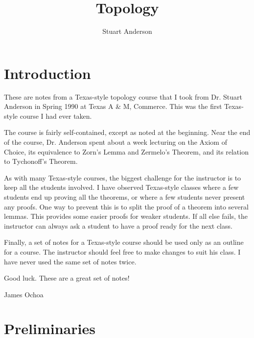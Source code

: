 \documentclass{article}
\let\titlepageAuthor\author
\renewcommand{\author}[1]{\newcommand{\headerAuthor}{#1}\titlepageAuthor{#1}}
\let\titlepageTitle\title
\renewcommand{\title}[1]{\newcommand{\headerTitle}{#1}\titlepageTitle{#1}}
\begin{document}
\title{Topology}
\author{Stuart Anderson}
\date{ }
\maketitle
\thispagestyle{empty}



\newpage

\section*{Introduction}


These are notes from a Texas-style topology course that I took from Dr. Stuart Anderson in Spring 1990 at Texas A \& M, Commerce. This was the first Texas-style course I had ever taken.

The course is fairly self-contained, except as noted at the beginning. Near the end of the course, Dr. Anderson spent about a week lecturing on the Axiom of Choice, its equivalence to Zorn's Lemma and Zermelo's Theorem, and its relation to Tychonoff's Theorem.

As with many Texas-style courses, the biggest challenge for the instructor is to keep all the students involved. I have observed Texas-style classes where a few students end up proving all the theorems, or where a few students never present any proofs. One way to prevent this is to split the proof of a theorem into several lemmas. This provides some easier proofs for weaker students. If all else fails, the instructor can always ask a student to have a proof ready for the next class.

Finally, a set of notes for a Texas-style course should be used only as an outline for a course. The instructor should feel free to make changes to suit his class. I have never used the same set of notes twice. 

Good luck. These are a great set of notes!

\begin{flushright}
James Ochoa
\end{flushright}


\section{Preliminaries}

\end{document}

